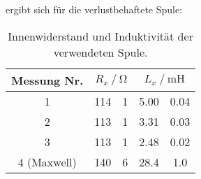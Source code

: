     ergibt sich für die verlustbehaftete Spule: 
    \begin{table}
        \centering
        \caption{Innenwiderstand und Induktivität der verwendeten Spule.}
        \label{tab:R_L_Spule}
        \begin{tabular}{c S[table-format=3.0] @{${}\pm{}$} S[table-format=1.0] S[table-format=2.2] @{${}\pm{}$} S[table-format=1.2]}
            \toprule
            {Messung Nr.} &  &  \\
                       & 114 & 1 & 5.00 & 0.04 \\
            2           & 113 & 1 & 3.31 & 0.03 \\
            3           & 113 & 1 & 2.48 & 0.02 \\
            4 (Maxwell) & 140 & 6 & 28.4 & 1.0  \\ %
            \bottomrule
        \end{tabular}
    \end{table}
